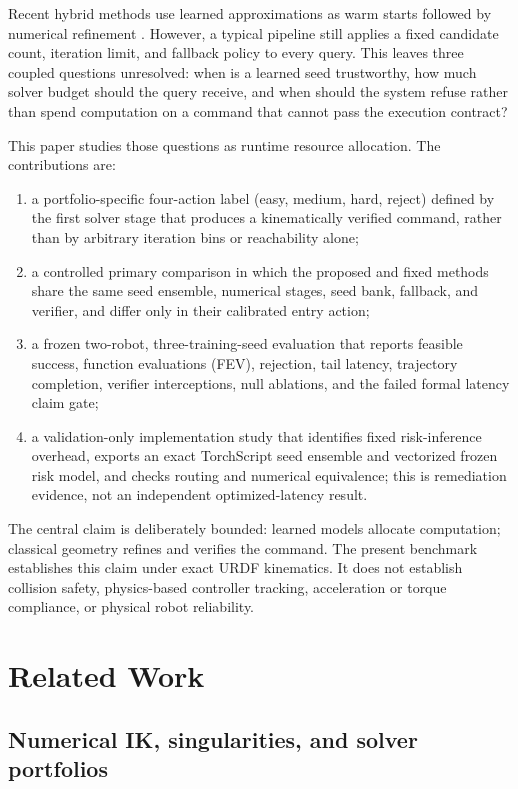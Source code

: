 \documentclass[10pt,a4paper]{article}
\begin{document}
Recent hybrid methods use learned approximations as warm starts followed by numerical
refinement \cite{habekost2023cycleik,jayabalan2026hybrid,jlidi2026xgnn}. However, a
typical pipeline still applies a fixed candidate count, iteration limit, and fallback
policy to every query. This leaves three coupled questions unresolved: when is a
learned seed trustworthy, how much solver budget should the query receive, and when
should the system refuse rather than spend computation on a command that cannot pass
the execution contract?

This paper studies those questions as runtime resource allocation. The contributions
are:
\begin{enumerate}
  \item a portfolio-specific four-action label (easy, medium, hard, reject) defined by
  the first solver stage that produces a kinematically verified command, rather than by arbitrary
  iteration bins or reachability alone;
  \item a controlled primary comparison in which the proposed and fixed methods share
  the same seed ensemble, numerical stages, seed bank, fallback, and verifier, and
  differ only in their calibrated entry action;
  \item a frozen two-robot, three-training-seed evaluation that reports feasible
  success, function evaluations (FEV), rejection, tail latency, trajectory completion,
  verifier interceptions, null ablations, and the failed formal latency claim gate;
  \item a validation-only implementation study that identifies fixed risk-inference
  overhead, exports an exact TorchScript seed ensemble and vectorized frozen risk
  model, and checks routing and numerical equivalence; this is remediation evidence,
  not an independent optimized-latency result.
\end{enumerate}

The central claim is deliberately bounded: learned models allocate computation;
classical geometry refines and verifies the command. The present benchmark establishes
this claim under exact URDF kinematics. It does not establish collision safety,
physics-based controller tracking, acceleration or torque compliance, or physical
robot reliability.

\section{Related Work}

\subsection{Numerical IK, singularities, and solver portfolios}
\end{document}
